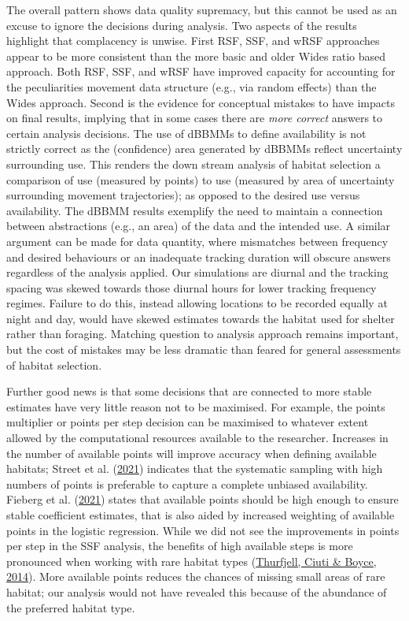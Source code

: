 \documentclass[10pt,a4paper]{article}
\begin{document}
The overall pattern shows data quality supremacy, but this cannot be used as an excuse to ignore the decisions during analysis.
Two aspects of the results highlight that complacency is unwise.
First RSF, SSF, and wRSF approaches appear to be more consistent than the more basic and older Wides ratio based approach.
Both RSF, SSF, and wRSF have improved capacity for accounting for the peculiarities movement data structure (e.g., via random effects) than the Wides approach.
Second is the evidence for conceptual mistakes to have impacts on final results, implying that in some cases there are \emph{more correct} answers to certain analysis decisions.
The use of dBBMMs to define availability is not strictly correct as the (confidence) area generated by dBBMMs reflect uncertainty surrounding use.
This renders the down stream analysis of habitat selection a comparison of use (measured by points) to use (measured by area of uncertainty surrounding movement trajectories); as opposed to the desired use versus availability.
The dBBMM results exemplify the need to maintain a connection between abstractions (e.g., an area) of the data and the intended use.
A similar argument can be made for data quantity, where mismatches between frequency and desired behaviours or an inadequate tracking duration will obscure answers regardless of the analysis applied.
Our simulations are diurnal and the tracking spacing was skewed towards those diurnal hours for lower tracking frequency regimes.
Failure to do this, instead allowing locations to be recorded equally at night and day, would have skewed estimates towards the habitat used for shelter rather than foraging.
Matching question to analysis approach remains important, but the cost of mistakes may be less dramatic than feared for general assessments of habitat selection.

Further good news is that some decisions that are connected to more stable estimates have very little reason not to be maximised.
For example, the points multiplier or points per step decision can be maximised to whatever extent allowed by the computational resources available to the researcher.
Increases in the number of available points will improve accuracy when defining available habitats; Street et al. (\protect\hyperlink{ref-street_solving_2021}{2021}) indicates that the systematic sampling with high numbers of points is preferable to capture a complete unbiased availability.
Fieberg et al. (\protect\hyperlink{ref-fieberg_how_2021}{2021}) states that available points should be high enough to ensure stable coefficient estimates, that is also aided by increased weighting of available points in the logistic regression.
While we did not see the improvements in points per step in the SSF analysis, the benefits of high available steps is more pronounced when working with rare habitat types (\protect\hyperlink{ref-thurfjell_applications_2014}{Thurfjell, Ciuti \& Boyce, 2014}).
More available points reduces the chances of missing small areas of rare habitat; our analysis would not have revealed this because of the abundance of the preferred habitat type.
\end{document}
